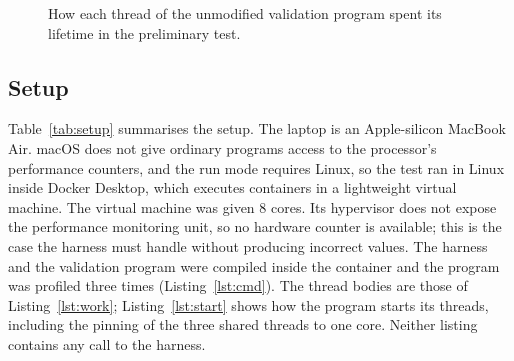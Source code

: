 \documentclass[10pt,a4paper,twocolumn]{article}
\begin{document}
\begin{figure}[t]
\centering
{}
\caption{How each thread of the unmodified validation program spent its lifetime in the preliminary test.}
\label{fig:prelim}
\end{figure}

\subsection{Setup}
Table~\ref{tab:setup} summarises the setup. The laptop is an Apple-silicon MacBook Air. macOS does not give ordinary programs access to the processor's performance counters, and the run mode requires Linux, so the test ran in Linux inside Docker Desktop, which executes containers in a lightweight virtual machine. The virtual machine was given 8 cores. Its hypervisor does not expose the performance monitoring unit, so no hardware counter is available; this is the case the harness must handle without producing incorrect values. The harness and the validation program were compiled inside the container and the program was profiled three times (Listing~\ref{lst:cmd}). The thread bodies are those of Listing~\ref{lst:work}; Listing~\ref{lst:start} shows how the program starts its threads, including the pinning of the three shared threads to one core. Neither listing contains any call to the harness.
\end{document}
